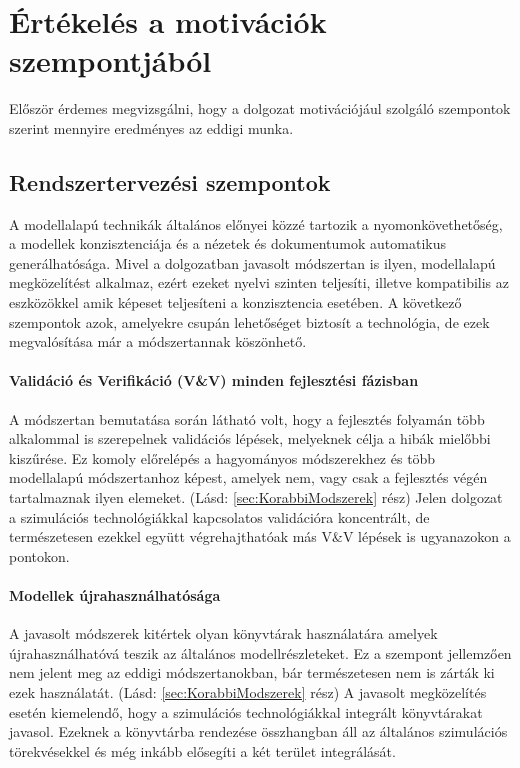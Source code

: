     \section{Értékelés a motivációk szempontjából}
    Először érdemes megvizsgálni, hogy a dolgozat motivációjául szolgáló szempontok szerint mennyire eredményes az eddigi munka.

        \subsection{Rendszertervezési szempontok}
        A modellalapú technikák általános előnyei közzé tartozik a nyomonkövethetőség, a modellek konzisztenciája és a nézetek és dokumentumok automatikus generálhatósága.
        Mivel a dolgozatban javasolt módszertan is ilyen, modellalapú megközelítést alkalmaz, ezért ezeket nyelvi szinten teljesíti, illetve kompatibilis az eszközökkel amik képeset teljesíteni a konzisztencia esetében.
        A következő szempontok azok, amelyekre csupán lehetőséget biztosít a technológia, de ezek megvalósítása már a módszertannak köszönhető.

            \paragraph{Validáció és Verifikáció (V\&V) minden fejlesztési fázisban} \label{ertekelesVV}
            A módszertan bemutatása során látható volt, hogy a fejlesztés folyamán több alkalommal is szerepelnek validációs lépések, melyeknek célja a hibák mielőbbi kiszűrése.
            Ez komoly előrelépés a hagyományos módszerekhez és több modellalapú módszertanhoz képest, amelyek nem, vagy csak a fejlesztés végén tartalmaznak ilyen elemeket. (Lásd: \ref{sec:KorabbiModszerek} rész)
            Jelen dolgozat a szimulációs technológiákkal kapcsolatos validációra koncentrált, de természetesen ezekkel együtt végrehajthatóak más V\&V lépések is ugyanazokon a pontokon.

            \paragraph{Modellek újrahasználhatósága}
            A javasolt módszerek kitértek olyan könyvtárak használatára amelyek újrahasználhatóvá teszik az általános modellrészleteket.
            Ez a szempont jellemzően nem jelent meg az eddigi módszertanokban, bár természetesen nem is zárták ki ezek használatát. (Lásd: \ref{sec:KorabbiModszerek} rész)
            A javasolt megközelítés esetén kiemelendő, hogy a szimulációs technológiákkal integrált könyvtárakat javasol. Ezeknek a könyvtárba rendezése összhangban áll az általános szimulációs törekvésekkel és még inkább elősegíti a két terület integrálását.

